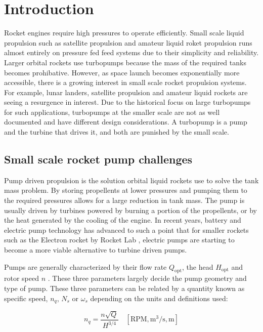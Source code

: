 \section{Introduction}

Rocket engines require high pressures to operate efficiently. Small scale liquid propulsion such as satellite propulsion and amateur liquid roket propulsion runs almost entirely on pressure fed feed systems due to their simplicity and reliability. Larger orbital rockets use turbopumps because the mass of the required tanks becomes prohibative. However, as space launch becomes exponentially more accessible, there is a growing interest in small scale rocket propulsion systems. For example, lunar landers, satellite propulsion and amateur liquid rockets are seeing a resurgence in interest. Due to the historical focus on large turbopumps for such applications, turbopumps at the smaller scale are not as well documented and have different design considerations. A turbopump is a pump and the turbine that drives it, and both are punished by the small scale.

\subsection{Small scale rocket pump challenges}

Pump driven propulsion is the solution orbital liquid rockets use to solve the tank mass problem. By storing propellents at lower pressures and pumping them to the required pressures allows for a large reduction in tank mass. The pump is usually driven by turbines powered by burning a portion of the propellents, or by the heat generated by the cooling of the engine. In recent years, battery and electric pump technology has advanced to such a point that for smaller rockets such as the Electron rocket by Rocket Lab \cite{electron}, electric pumps are starting to become a more viable alternative to turbine driven pumps. 

Pumps are generally characterized by their flow rate $Q_{\textrm{opt}}$, the head $H_{\textrm{opt}}$ and rotor speed $n$ \cite{gulich}. These three parameters largely decide the pump geometry and type of pump. These three parameters can be related by a quantity known as specific speed, $n_q$, $N_s$ or $\omega_s$ depending on the units and definitions used:

\begin{equation}
    n_q = \frac{n \sqrt{Q}}{H^{3/4}} \quad [\text{RPM}, \text{m}^3/\text{s}, \text{m}] \label{eq:specific_speed}
\end{equation}


